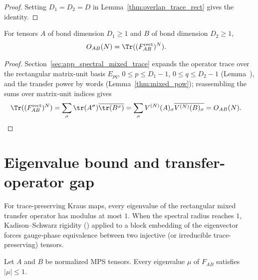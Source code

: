 \begin{proof}
    \leanok
    Setting $D_1=D_2=D$ in Lemma~\ref{thm:overlap_trace_rect} gives the
    identity.
\end{proof}

\begin{lemma}\label{thm:overlap_trace_rect}
    \leanok
    For tensors $A$ of bond dimension $D_1\geq1$ and $B$ of bond
    dimension $D_2\geq1$,
    \begin{align}
        O_{AB}(N)
         & =\Tr((F_{AB}^{\mathrm{rect}})^N).
        \label{eq:spectral_overlap_trace_rect}
    \end{align}
\end{lemma}

\begin{proof}\leanok
    Section~\ref{sec:app_spectral_mixed_trace} expands the operator trace
    over the rectangular matrix-unit basis $E_{pq}$, $0\leq p\leq D_1-1$,
    $0\leq q\leq D_2-1$ (Lemma~\cite[``Trace expansion over matrix units'']{QICLean2026Blueprint}), and
    the transfer power by words (Lemma~\ref{thm:mixed_pow}); reassembling
    the sums over matrix-unit indices gives
    \begin{align}
        \Tr((F_{AB}^{\mathrm{rect}})^N)
         & =\sum_\sigma
        \tr(A^\sigma)\overline{\tr(B^\sigma)}
        =\sum_\sigma
        V^{(N)}(A)_\sigma\overline{V^{(N)}(B)_\sigma}
        =O_{AB}(N).
        \notag
    \end{align}
\end{proof}

\section{Eigenvalue bound and transfer-operator gap}

For trace-preserving Kraus maps, every eigenvalue of the rectangular mixed
transfer operator has modulus at most $1$. When the spectral radius reaches $1$,
Kadison--Schwarz rigidity (\cite[Theorem~5.3]{Wolf2012Quantum}) applied to a block
embedding of the eigenvector forces gauge-phase equivalence between two injective
(or irreducible trace-preserving) tensors.

\begin{lemma}\label{thm:eigenvalue_bound}
    \leanok
    Let $A$ and $B$ be normalized MPS tensors. Every eigenvalue $\mu$ of
    $F_{AB}$ satisfies $|\mu|\leq1$.
\end{lemma}

